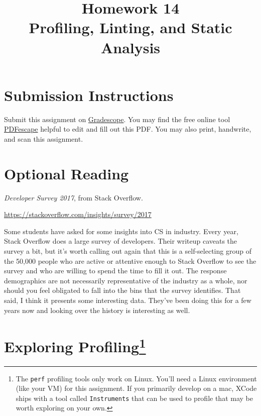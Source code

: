 \documentclass{article}
\begin{document}
\fancyhead[L]{}
\fancyhead[R]{}

\fancyfoot[C]{\color{gray} \thepage~/~\pageref*{LastPage}}
\pagestyle{fancyplain}

\title{\textbf{Homework 14\\Profiling, Linting, and Static Analysis}}
\author{\textbf{\color{red}{Due: Wednesday, April 18th, 11:59PM (Hard Deadline)}}}
\date{}
\maketitle


\section*{Submission Instructions}
Submit this assignment on \href{https://gradescope.com/courses/13649}{Gradescope}.
You may find the free online tool \href{https://www.pdfescape.com}{PDFescape}
helpful to edit and fill out this PDF.
You may also print, handwrite, and scan this assignment.


\section*{Optional Reading}

\emph{Developer Survey 2017}, from Stack Overflow.

\url{https://stackoverflow.com/insights/survey/2017}

Some students have asked for some insights into CS in industry. Every year,
Stack Overflow does a large survey of developers. Their writeup caveats the
survey a bit, but it's worth calling out again that this is a self-selecting
group of the 50,000 people who are active or attentive enough to Stack
Overflow to see the survey and who are willing to spend the time to fill it
out. The response demographics are not necessarily representative of the
industry as a whole, nor should you feel obligated to fall into the bins that
the survey identifies. That said, I think it presents some interesting data.
They've been doing this for a few years now and looking over the history is
interesting as well.


\newpage


\section{Exploring Profiling\protect\footnote{%
  The \texttt{perf} profiling tools only work on Linux. You'll need a Linux
  environment (like your VM) for this assignment. If you primarily develop on
  a mac, XCode ships with a tool called \texttt{Instruments} that can be used
  to profile that may be worth exploring on your own.
}}
\end{document}
